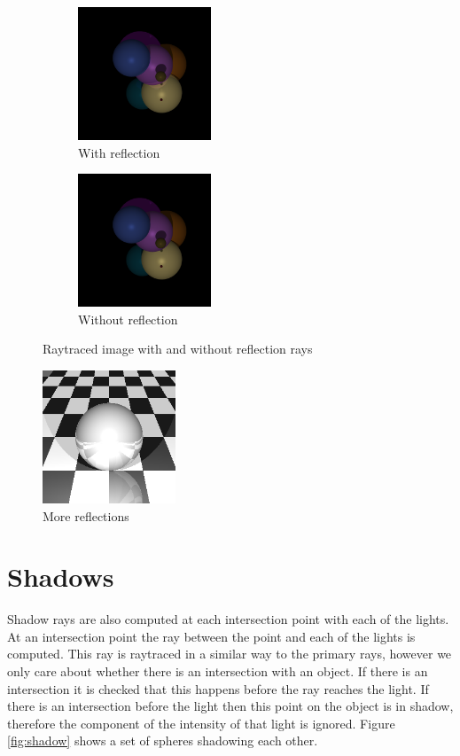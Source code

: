 \documentclass{article}
\begin{document}
\begin{figure}[H]
\centering
\begin{subfigure}{.5\textwidth}
  \centering
  \includegraphics[width=150px]{Images/reflectionsOn.png}
  \caption{With reflection}
\end{subfigure}%
\begin{subfigure}{.5\textwidth}
  \centering
  \includegraphics[width=150px]{Images/reflectionsOff.png}
  \caption{Without reflection}
\end{subfigure}
\caption{Raytraced image with and without reflection rays}
\label{fig:reflectionrays}
\end{figure}


\begin{figure}[H]
  \begin{center}
  \includegraphics[width=150px]{Images/gridSphere.png}
  \caption{More reflections}
  \label{fig:reflections}
  \end{center}
\end{figure}

\section{Shadows}

Shadow rays are also computed at each intersection point with each of the lights.
At an intersection point the ray between the point and each of the lights is computed.
This ray is raytraced in a similar way to the primary rays, however we only care about whether
there is an intersection with an object. If there is an intersection it is checked
that this happens before the ray reaches the light. If there is an intersection before
the light then this point on the object is in shadow, therefore the component of the
intensity of that light is ignored. Figure \ref{fig:shadow} shows a set of spheres
shadowing each other.
\end{document}
